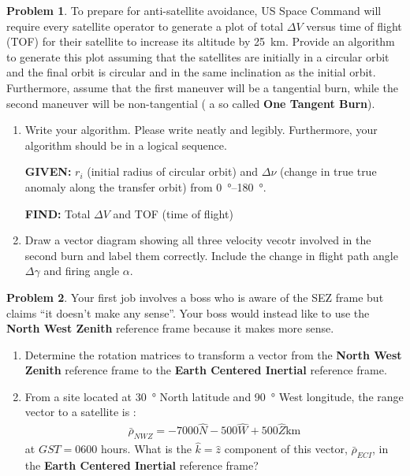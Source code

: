 \documentclass[10pt]{article}
\theoremstyle{definition}
\newtheorem{prob}{Problem}[section]
\newenvironment{subprob}%
{\renewcommand{\theenumi}{\alph{enumi}}\renewcommand{\labelenumi}{(\theenumi)}\begin{enumerate}}%
{\end{enumerate}}%
\begin{document}
\clearpage\newpage
\null\newpage
\null\newpage
\begin{prob}
    To prepare for anti-satellite avoidance, US Space Command will require every satellite operator to generate a plot of total \( \Delta V \) versus time of flight (TOF) for their satellite to increase its altitude by \SI{25}{\kilo\meter}. 
    Provide an algorithm to generate this plot assuming that the satellites are initially in a circular orbit and the final orbit is circular and in the same inclination as the initial orbit. 
    Furthermore, assume that the first maneuver will be a tangential burn, while the second maneuver will be non-tangential ( a so called \textbf{One Tangent Burn}).

    \begin{subprob}
    \item Write your algorithm.
        Please write neatly and legibly.
        Furthermore, your algorithm should be in a logical sequence. 

        \textbf{GIVEN:} \( r_i\) (initial radius of circular orbit) and \( \Delta \nu\) (change in true true anomaly along the transfer orbit) from \SIrange{0}{180}{\degree}.

        \textbf{FIND:} Total \( \Delta V\) and TOF (time of flight)

        \vspace{0.5\textheight}
    \item Draw a vector diagram showing all three velocity vecotr involved in the second burn and label them correctly.
        Include the change in flight path angle \( \Delta \gamma \) and firing angle \( \alpha \).
    \end{subprob} 
\end{prob}    

\clearpage\newpage
\null\newpage
\null\newpage

\begin{prob}
    Your first job involves a boss who is aware of the SEZ frame but claims ``it doesn't make any sense''.
    Your boss would instead like to use the \textbf{North West Zenith} reference frame because it makes more sense.

    \begin{subprob}
    \item Determine the rotation matrices to transform a vector from the \textbf{North West Zenith} reference frame to the \textbf{Earth Centered Inertial} reference frame.
    \item From a site located at \SI{30}{\degree} North latitude and \SI{90}{\degree} West longitude, the range vector to a satellite is :
        \begin{align*}
            \bar \rho_{NWZ} = - 7000 \hat N - 500 \hat W + 500 \hat Z \si{\kilo\meter}
        \end{align*}
        at \( GST = 0600\) hours.
        What is the \( \hat k = \hat z \) component of this vector, \( \bar \rho_{ECI}\), in the \textbf{Earth Centered Inertial} reference frame?
    \end{subprob}
\end{prob}
\end{document}
